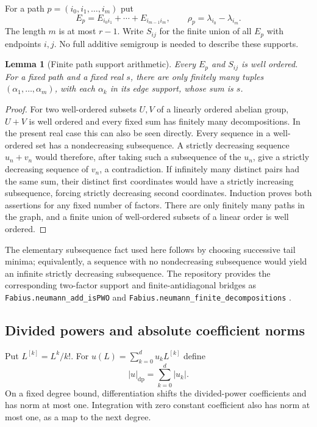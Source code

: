 \documentclass[11pt,a4paper]{article}
\numberwithin{equation}{section}
\newtheorem{lemma}[theorem]{Lemma}
\theoremstyle{definition}
\theoremstyle{remark}
\newcommand{\dplog}[1]{L^{[#1]}}
\begin{document}
For a path $p=(i_0,i_1,\ldots,i_m)$ put
\begin{equation}\label{eq:pathsum}
 E_p=E_{i_0i_1}+\cdots+E_{i_{m-1}i_m},\qquad
 \rho_p=\lambda_{i_0}-\lambda_{i_m}.
\end{equation}
The length $m$ is at most $r-1$. Write $S_{ij}$ for the finite union of all
$E_p$ with endpoints $i,j$. No full additive semigroup is needed to describe
these supports.

\begin{lemma}[Finite path support arithmetic]\label{lem:support}
Every $E_p$ and $S_{ij}$ is well ordered. For a fixed path and a fixed real
$s$, there are only finitely many tuples
$(\alpha_1,\ldots,\alpha_m)$, with each $\alpha_k$ in its edge support,
whose sum is $s$.
\end{lemma}
\begin{proof}
For two well-ordered subsets $U,V$ of a linearly ordered abelian group,
$U+V$ is well ordered and every fixed sum has finitely many decompositions.
In the present real case this can also be seen directly. Every sequence in
a well-ordered set has a nondecreasing subsequence. A strictly decreasing
sequence $u_n+v_n$ would therefore, after taking such a subsequence of the
$u_n$, give a strictly decreasing sequence of $v_n$, a contradiction.
If infinitely many distinct pairs had the same sum, their distinct first
coordinates would have a strictly increasing subsequence, forcing strictly
decreasing second coordinates. Induction proves both assertions for any
fixed number of factors. There are only finitely many paths in the graph,
and a finite union of well-ordered subsets of a linear order is well
ordered.
\end{proof}

The elementary subsequence fact used here follows by choosing successive
tail minima; equivalently, a sequence with no nondecreasing subsequence
would yield an infinite strictly decreasing subsequence. The repository
provides the corresponding two-factor support and finite-antidiagonal
bridges as \texttt{Fabius.neumann\_add\_isPWO} and
\texttt{Fabius.neumann\_finite\_decompositions} \cite{repo-lean}.

\subsection{Divided powers and absolute coefficient norms}
Put $\dplog{k}=L^k/k!$. For
$u(L)=\sum_{k=0}^d u_k\dplog{k}$ define
\begin{equation}\label{eq:polynorm}
 |u|_{\mathrm{dp}}=\sum_{k=0}^d|u_k|.
\end{equation}
On a fixed degree bound, differentiation shifts the divided-power
coefficients and has norm at most one. Integration with zero constant
coefficient also has norm at most one, as a map to the next degree.
\end{document}
